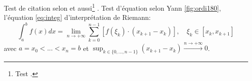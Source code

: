 \documentclass[a4paper,12pt]{article}
\begin{document}
	Test de citation selon \cite{AbedonHymanThomas2003} et aussi\footnote{Test \cite{Nobody06}.} \cite{Abedon1994}.
	Test d'équation selon Yann \ref{fig:ordi180}, l'équation \eqref{eq:integ} d'interprétation de Riemann:
	\begin{equation}
		\int_a^bf(x)dx = \lim_{n\rightarrow + \infty}\sum_{k=0}^{n-1}\left[ f\left(\xi_k\right)\cdot (x_{k+1}-x_k)\right], \quad\xi_k \in [x_k, x_{k+1}]  \label{eq:integ}
	\end{equation}
	avec $a = x_0 < ... < x_n = b$ et $\sup_{k \in \{0,...,  n-1\}}( x_{k+1}-x_{k}) \overset{n \rightarrow + \infty}{\longrightarrow} 0$.

\newpage
\fancyhead[L]{}


\end{document}
